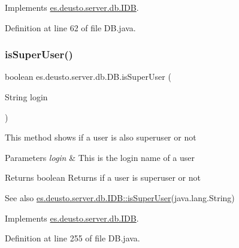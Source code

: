 Implements \hyperlink{interfacees_1_1deusto_1_1server_1_1db_1_1_i_d_b_ac5ef9780a640140576f9373f8b57631c}{es.\+deusto.\+server.\+db.\+I\+DB}.



Definition at line 62 of file D\+B.\+java.

\mbox{\label{classes_1_1deusto_1_1server_1_1db_1_1_d_b_a53a59425c7690f07861fd5d006f83cbc}} 
\subsubsection{\texorpdfstring{is\+Super\+User()}{isSuperUser()}}
{\footnotesize\ttfamily boolean es.\+deusto.\+server.\+db.\+D\+B.\+is\+Super\+User (\begin{DoxyParamCaption}\item[{String}]{login }\end{DoxyParamCaption})}

This method shows if a user is also superuser or not 
\begin{DoxyParams}{Parameters}
{\em login} & This is the login name of a user \\
\hline
\end{DoxyParams}
\begin{DoxyReturn}{Returns}
boolean Returns if a user is superuser or not 
\end{DoxyReturn}
\begin{DoxySeeAlso}{See also}
\hyperlink{interfacees_1_1deusto_1_1server_1_1db_1_1_i_d_b_a279d8a59498d4157f2d20ce7f0c4cfdb}{es.\+deusto.\+server.\+db.\+I\+D\+B\+::is\+Super\+User}(java.\+lang.\+String) 
\end{DoxySeeAlso}


Implements \hyperlink{interfacees_1_1deusto_1_1server_1_1db_1_1_i_d_b_a279d8a59498d4157f2d20ce7f0c4cfdb}{es.\+deusto.\+server.\+db.\+I\+DB}.



Definition at line 255 of file D\+B.\+java.

\mbox{\label{classes_1_1deusto_1_1server_1_1db_1_1_d_b_a8e5744311b5924e740d190673abee104}} 
